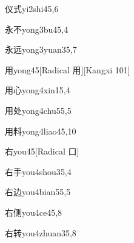 \begin{verbete}{仪式}{yi2shi4}{5,6}
\end{verbete}

\begin{verbete}{永不}{yong3bu4}{5,4}
\end{verbete}

\begin{verbete}{永远}{yong3yuan3}{5,7}
\end{verbete}

\begin{verbete}{用}{yong4}{5}[Radical 用][Kangxi 101]
\end{verbete}

\begin{verbete}{用心}{yong4xin1}{5,4}
\end{verbete}

\begin{verbete}{用处}{yong4chu5}{5,5}
\end{verbete}

\begin{verbete}{用料}{yong4liao4}{5,10}
\end{verbete}

\begin{verbete}{右}{you4}{5}[Radical 口]
\end{verbete}

\begin{verbete}{右手}{you4shou3}{5,4}
\end{verbete}

\begin{verbete}{右边}{you4bian5}{5,5}
\end{verbete}

\begin{verbete}{右侧}{you4ce4}{5,8}
\end{verbete}

\begin{verbete}{右转}{you4zhuan3}{5,8}
\end{verbete}

